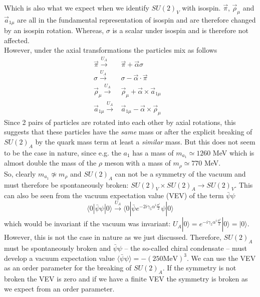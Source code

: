 Which is also what we expect when we identify $SU(2)_V$ with isospin. $\vec{\pi}$, $\vec{\rho}_{\mu}$ and $\vec{a}_{1 \mu}$ are all in the fundamental representation of isospin and are therefore changed by an isospin rotation. Whereas, $\sigma$ is a scalar under isospin and is therefore not affected. \\
However, under the axial transformations the particles mix as follows
\begin{align}
\vec{\pi} \overset{U_A}{\longrightarrow} & \vec{\pi} + \vec{\alpha} \sigma & \\
\sigma \overset{U_A}{\longrightarrow} & \sigma - \vec{\alpha} \cdot \vec{\pi} & \\
\vec{\rho}_{\mu} \overset{U_A}{\longrightarrow} & \vec{\rho}_{\mu} + \vec{\alpha} \times \vec{a}_{1 \mu} & \\
\vec{a}_{1 \mu} \overset{U_A}{\longrightarrow} & \vec{a}_{1 \mu} - \vec{\alpha} \times \vec{\rho}_{\mu}
\end{align}
Since 2 pairs of particles are rotated into each other by axial rotations, this suggests that these particles have the \textit{same} mass or after the explicit breaking of $SU(2)_A$ by the quark mass term at least a \textit{similar} mass. But this does not seem to be the case in nature, since e.g. the $a_1$ has a mass of $m_{a_1} \simeq 1260$ MeV which is almost double the mass of the $\rho$ meson with a mass of $m_{\rho} \simeq 770$ MeV. \\
So, clearly $m_{a_1} \not\simeq m_{\rho}$ and $SU(2)_A$ can not be a symmetry of the vacuum and must therefore be spontaneously broken: $SU(2)_V \times SU(2)_A \rightarrow SU(2)_V$. This can also be seen from the vacuum expectation value (VEV) of the term $\bar{\psi}\psi$ 
\begin{equation}
\label{eqn:vev} 
\langle 0 | \bar{\psi} \psi | 0 \rangle \overset{U_A}{\longrightarrow} \langle 0 |   \bar{\psi} e^{-2i \gamma_5 \alpha^i \frac{\sigma^i}{2}} \psi | 0 \rangle
\end{equation}
which would be invariant if the vacuum was invariant: $U_A | 0 \rangle = e^{-i \gamma_5 \alpha^i \frac{\sigma^i}{2}} | 0 \rangle = | 0 \rangle$. However, this is not the case in nature as we just discussed. Therefore, $SU(2)_A$ must be spontaneously broken and $\bar{\psi}\psi$ -- the so-called chiral condensate -- must develop a vacuum expectation value $\langle \bar{\psi}\psi \rangle = - \left( 250 \text{MeV} \right)^3$. We can use the VEV as an order parameter for the breaking of $SU(2)_A$. If the symmetry is not broken the VEV is zero and if we have a finite VEV the symmetry is broken as we expect from an order parameter. \\
